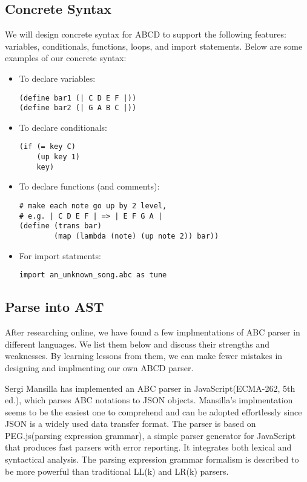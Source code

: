 \subsection{Concrete Syntax}

We will design concrete syntax for ABCD to support the following features: variables, conditionals, functions, loops, and import statements. Below are some examples of our concrete syntax:

\begin{itemize}
\item To declare variables:
\begin{verbatim}
(define bar1 (| C D E F |))
(define bar2 (| G A B C |))
\end{verbatim}

\item To declare conditionals:
\begin{verbatim}
(if (= key C)
    (up key 1)
    key)
\end{verbatim}

\item To declare functions (and comments):
\begin{verbatim}
# make each note go up by 2 level, 
# e.g. | C D E F | => | E F G A |
(define (trans bar)
        (map (lambda (note) (up note 2)) bar))
\end{verbatim}

\item For import statments:
\begin{verbatim}
import an_unknown_song.abc as tune
\end{verbatim}
\end{itemize}

\subsection{Parse into AST}

After researching online, we have found a few implmentations of ABC parser in different languages. We list them below and discuss their strengths and weaknesses. By learning lessons from them, we can make fewer mistakes in designing and implmenting our own ABCD parser.

Sergi Mansilla has implemented an ABC parser in JavaScript(ECMA-262, 5th ed.), which parses ABC notations to JSON objects\cite{Mansilla12}. Mansilla's implmentation seems to be the easiest one to comprehend and can be adopted effortlessly since JSON is a widely used data transfer format. The parser is based on PEG.js(parsing expression grammar), a simple parser generator for JavaScript that produces fast parsers with error reporting\cite{Ryuu17}. It integrates both lexical and syntactical analysis. The parsing expression grammar formalism is described to be more powerful than traditional LL(k) and LR(k) parsers.

